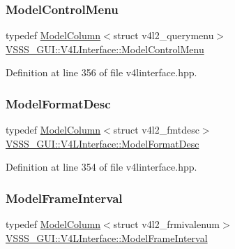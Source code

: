 \subsubsection{\texorpdfstring{Model\+Control\+Menu}{ModelControlMenu}}
{\footnotesize\ttfamily typedef \hyperlink{class_v_s_s_s___g_u_i_1_1_v4_l_interface_1_1_model_column}{Model\+Column}$<$struct v4l2\+\_\+querymenu$>$ \hyperlink{class_v_s_s_s___g_u_i_1_1_v4_l_interface_a4aa300e0a5f845ba2d153774035a9d97}{V\+S\+S\+S\+\_\+\+G\+U\+I\+::\+V4\+L\+Interface\+::\+Model\+Control\+Menu}\hspace{0.3cm}{\ttfamily [private]}}



Definition at line 356 of file v4linterface.\+hpp.

\mbox{\label{class_v_s_s_s___g_u_i_1_1_v4_l_interface_a9bb7c5c7917abee18c12e6aaa0c4a880}} 
\subsubsection{\texorpdfstring{Model\+Format\+Desc}{ModelFormatDesc}}
{\footnotesize\ttfamily typedef \hyperlink{class_v_s_s_s___g_u_i_1_1_v4_l_interface_1_1_model_column}{Model\+Column}$<$struct v4l2\+\_\+fmtdesc$>$ \hyperlink{class_v_s_s_s___g_u_i_1_1_v4_l_interface_a9bb7c5c7917abee18c12e6aaa0c4a880}{V\+S\+S\+S\+\_\+\+G\+U\+I\+::\+V4\+L\+Interface\+::\+Model\+Format\+Desc}\hspace{0.3cm}{\ttfamily [private]}}



Definition at line 354 of file v4linterface.\+hpp.

\mbox{\label{class_v_s_s_s___g_u_i_1_1_v4_l_interface_a7813513200948f4605691c33e40e15a9}} 
\subsubsection{\texorpdfstring{Model\+Frame\+Interval}{ModelFrameInterval}}
{\footnotesize\ttfamily typedef \hyperlink{class_v_s_s_s___g_u_i_1_1_v4_l_interface_1_1_model_column}{Model\+Column}$<$struct v4l2\+\_\+frmivalenum$>$ \hyperlink{class_v_s_s_s___g_u_i_1_1_v4_l_interface_a7813513200948f4605691c33e40e15a9}{V\+S\+S\+S\+\_\+\+G\+U\+I\+::\+V4\+L\+Interface\+::\+Model\+Frame\+Interval}\hspace{0.3cm}{\ttfamily [private]}}



